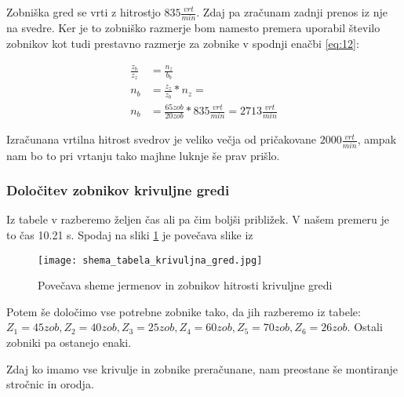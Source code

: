 Zobniška gred se vrti z hitrostjo \(835 \frac{vrt}{min}\). Zdaj pa zračunam
zadnji prenos iz nje na svedre. Ker je to zobniško razmerje bom namesto
premera uporabil število zobnikov kot tudi prestavno razmerje za zobnike
v spodnji enačbi \ref{eq:12}:

\begin{equation}
	\label{eq:12}
	\begin{split}
		\frac{z_b}{z_z} &= \frac{n_z}{b_b} \\
		n_b &= \frac{z_z}{z_b} * n_z = \\
		n_b &= \frac{65 zob}{20 zob} * 835 \frac{vrt}{min} = 2713 \frac{vrt}{min}
	\end{split}
\end{equation}

Izračunana vrtilna hitrost svedrov je veliko večja od pričakovane \(2000\frac{vrt}{min}\),
ampak nam bo to pri vrtanju tako majhne luknje še prav prišlo.

\subsubsection{Določitev zobnikov krivuljne gredi}

Iz tabele v  razberemo željen čas
ali pa čim boljši približek. V našem premeru je to čas 10.21 s.
Spodaj na sliki \ref{povecava} je povečava slike iz 
\begin{figure}[H]
	\begin{center}
		\texttt{[image: shema\_tabela\_krivuljna\_gred.jpg]}
		\caption{Povečava sheme jermenov in zobnikov
			hitrosti krivuljne gredi
			\cite{gauthier}}
		\label{povecava}
	\end{center}
\end{figure}

Potem še določimo vse potrebne zobnike tako, da jih razberemo iz tabele: \\
\(Z_1 = 45 zob, Z_2 = 40 zob, Z_3 = 25 zob, Z_4 = 60 zob, Z_5 = 70 zob, Z_6 = 26 zob\).
Ostali zobniki pa ostanejo enaki.

Zdaj ko imamo vse krivulje in zobnike preračunane, nam preostane še montiranje stročnic in orodja.